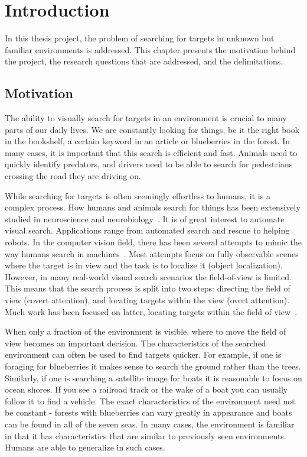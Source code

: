 \chapter{Introduction}
\label{cha:introduction}

In this thesis project, the problem of searching for targets in unknown but familiar environments is addressed. This chapter presents the motivation behind the project, the research questions that are addressed, and the delimitations. 

\section{Motivation}
\label{sec:motivation}

The ability to visually search for targets in an environment is crucial to many parts of our daily lives. We are constantly looking for things, be it the right book in the bookshelf, a certain keyword in an article or blueberries in the forest. In many cases, it is important that this search is efficient and fast. Animals need to quickly identify predators, and drivers need to be able to search for pedestrians crossing the road they are driving on.

While searching for targets is often seemingly effortless to humans, it is a complex process. How humans and animals search for things has been extensively studied in neuroscience and neurobiology~\cite{eckstein_visual_2011,wolfe_visual_2010,wolfe_guided_2021}. It is of great interest to automate visual search. Applications range from automated search and rescue to helping robots. In the computer vision field, there has been several attempts to mimic the way humans search in machines~\cite{}. Most attempts focus on fully observable scenes where the target is in view and the task is to localize it (object localization). However, in many real-world visual search scenarios the field-of-view is limited. This means that the search process is split into two steps: directing the field of view (covert attention), and locating targets within the view (overt attention). Much work has been focused on latter, locating targets within the field of view~\cite{}. 

When only a fraction of the environment is visible, where to move the field of view becomes an important decision. The characteristics of the searched environment can often be used to find targets quicker. For example, if one is foraging for blueberries it makes sense to search the ground rather than the trees. Similarly, if one is searching a satellite image for boats it is reasonable to focus on ocean shores. If you see a railroad track or the wake of a boat you can usually follow it to find a vehicle. The exact characteristics of the environment need not be constant - forests with blueberries can vary greatly in appearance and boats can be found in all of the seven seas. In many cases, the environment is familiar in that it has characteristics that are similar to previously seen environments. Humans are able to generalize in such cases.

